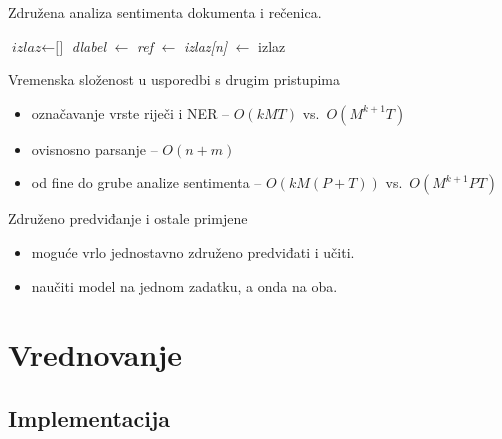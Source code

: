 \documentclass{beamer}
\begin{document}
\begin{frame}{Združena analiza sentimenta dokumenta i rečenica.}
  \begin{algorithm}[H]
  \begin{algorithmic}[1]
  \State $\textit{izlaz} \gets \text{[]}$
  \State \textit{dlabel} $\gets$ 
  \State {} 
    \State \textit{ref} $\gets$ 
    \State \textit{izlaz[n]} $\gets$ 
  \EndFor
  \State {}
  \Return izlaz
  \EndFunction
  \end{algorithmic}
  \end{algorithm}
\end{frame}

\begin{frame}{Vremenska složenost u usporedbi s drugim pristupima}
  \begin{itemize}
    \item označavanje vrste riječi i NER -- $O(k M T)$ vs.~$O(M^{k+1} T)$
    \item ovisnosno parsanje -- $O(n + m)$
    \item od fine do grube analize sentimenta -- $O(k M (P + T))$ vs.~$O(M^{k+1} P T)$
  \end{itemize}
\end{frame}

\begin{frame}{Združeno predviđanje i ostale primjene}
  \begin{itemize}
    \item moguće vrlo jednostavno združeno predviđati i učiti.
    \item naučiti model na jednom zadatku, a onda na oba.
  \end{itemize}
\end{frame}

\section{Vrednovanje}

\subsection{Implementacija}
\end{document}
